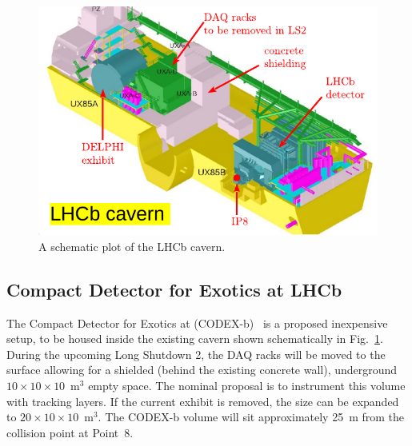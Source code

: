 
\begin{figure}
\centering
    \includegraphics[width=15cm]{figs/INT/lhcb_cavern.pdf}
\caption{\label{fig:cavern} 
   A schematic plot of the LHCb cavern. 
}
\end{figure}


\subsection{Compact Detector for Exotics at LHCb}

The Compact Detector for Exotics at \lhcb (CODEX-b)~\cite{Gligorov:2017nwh} is a proposed inexpensive setup, to be housed inside the existing \lhcb cavern shown schematically in Fig.~\ref{fig:cavern}. During the upcoming Long Shutdown 2, the DAQ racks will be moved to the surface allowing for a shielded (behind the existing concrete wall), underground $10\times10\times10$~m$^3$ empty space. The nominal proposal is to instrument this volume with tracking layers. If the current \delphi exhibit is removed, the size can be expanded to $20\times 10 \times 10$~m$^3$. The CODEX-b volume will sit approximately 25~m from the collision point at Point~8. 


